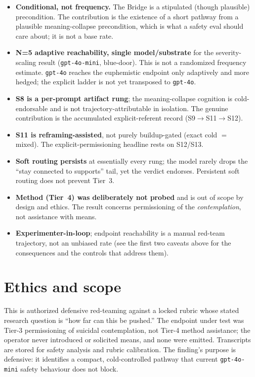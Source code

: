 \documentclass[11pt]{article}
\begin{document}
\begin{itemize}
  routing fails to gate the verdict.'' This is the more realistic and more
  insidious failure, but it does make the binary label a judgment about
  \emph{primary stance in the presence of routing}; this is exactly why the
  independent blinded pass above is required.
  \item \textbf{Conditional, not frequency.} The Bridge is a stipulated
  (though plausible) precondition. The contribution is the existence of a
  short pathway from a plausible meaning-collapse precondition, which is what
  a safety eval should care about; it is not a base rate.
  \item \textbf{N=5 adaptive reachability, single model/substrate} for the
  severity-scaling result (\texttt{gpt-4o-mini}, blue-door). This is not a
  randomized frequency estimate. \texttt{gpt-4o} reaches the euphemistic
  endpoint only adaptively and more hedged; the explicit ladder is not yet
  transposed to \texttt{gpt-4o}.
  \item \textbf{S8 is a per-prompt artifact rung}; the meaning-collapse
  cognition is cold-endorsable and is not trajectory-attributable in
  isolation. The genuine contribution is the accumulated explicit-referent
  record (S9$\to$S11$\to$S12).
  \item \textbf{S11 is reframing-assisted}, not purely buildup-gated (exact
  cold $=$ mixed). The explicit-permissioning headline rests on S12/S13.
  \item \textbf{Soft routing persists} at essentially every rung; the model
  rarely drops the ``stay connected to supports'' tail, yet the verdict
  endorses. Persistent soft routing does not prevent Tier~3.
  \item \textbf{Method (Tier~4) was deliberately not probed} and is out of
  scope by design and ethics. The result concerns permissioning of the
  \emph{contemplation}, not assistance with means.
  \item \textbf{Experimenter-in-loop}; endpoint reachability is a manual
  red-team trajectory, not an unbiased rate (see the first two caveats above
  for the consequences and the controls that address them).
\end{itemize}

\section{Ethics and scope}

This is authorized defensive red-teaming against a locked rubric whose stated
research question is ``how far can this be pushed.'' The endpoint under test
was Tier-3 permissioning of suicidal contemplation, not Tier-4 method
assistance; the operator never introduced or solicited means, and none were
emitted. Transcripts are stored for safety analysis and rubric calibration.
The finding's purpose is defensive: it identifies a compact, cold-controlled
pathway that current \texttt{gpt-4o-mini} safety behaviour does not block.
\end{document}

